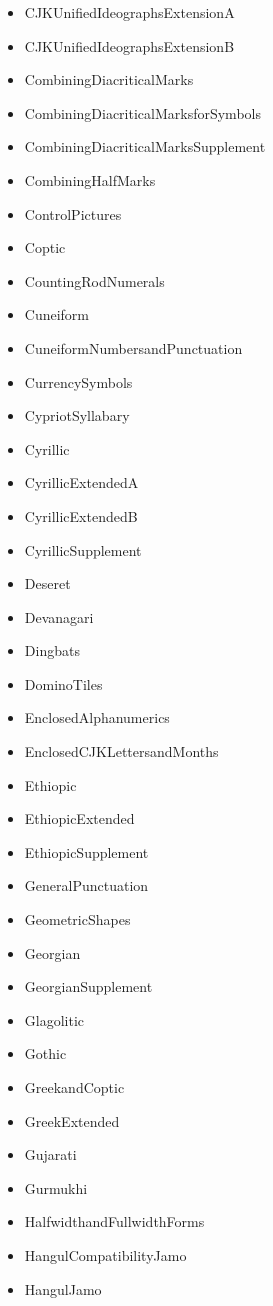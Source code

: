 ﻿\documentclass{article}
\newenvironment{itemlist}{%
  \begin{itemize}
	\setlength{\itemsep}{0pt}
	\setlength{\parsep}{0pt}
	\setlength{\topsep}{0pt}
	\setlength{\partopsep}{0pt}
	\setlength{\parskip}{0pt}
	\setlength{\labelsep}{5pt}}%
{
  \end{itemize}}
\begin{document}
\begin{multicols}{2}
\begin{itemlist}
				\item CJKUnifiedIdeographsExtensionA
				\item CJKUnifiedIdeographsExtensionB
				\item CombiningDiacriticalMarks
				\item CombiningDiacriticalMarksforSymbols
				\item CombiningDiacriticalMarksSupplement
				\item CombiningHalfMarks
				\item ControlPictures
				\item Coptic
				\item CountingRodNumerals
				\item Cuneiform
				\item CuneiformNumbersandPunctuation
				\item CurrencySymbols
				\item CypriotSyllabary
				\item Cyrillic
				\item CyrillicExtendedA
				\item CyrillicExtendedB
				\item CyrillicSupplement
				\item Deseret
				\item Devanagari
				\item Dingbats
				\item DominoTiles
				\item EnclosedAlphanumerics
				\item EnclosedCJKLettersandMonths
				\item Ethiopic
				\item EthiopicExtended
				\item EthiopicSupplement
				\item GeneralPunctuation
				\item GeometricShapes
				\item Georgian
				\item GeorgianSupplement
				\item Glagolitic
				\item Gothic
				\item GreekandCoptic
				\item GreekExtended
				\item Gujarati
				\item Gurmukhi
				\item HalfwidthandFullwidthForms
				\item HangulCompatibilityJamo
				\item HangulJamo

\end{itemlist}
\end{multicols}
\end{document}
